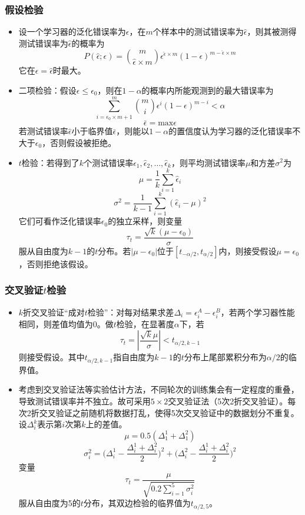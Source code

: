 \documentclass{ctexart}
\begin{document}
					\subsubsection{假设检验}
						\begin{itemize}
							\item 设一个学习器的泛化错误率为$\epsilon$，在$m$个样本中的测试错误率为$\hat{\epsilon}$，则其被测得测试错误率为$\hat{\epsilon}$的概率为\[P(\hat{\epsilon};\epsilon)=\binom{m}{\hat{\epsilon}\times m}\epsilon^{\hat{\epsilon}\times m}(1-\epsilon)^{m-\hat{\epsilon}\times m}\]它在$\epsilon=\hat{\epsilon}$时最大。
							\item 二项检验：假设$\epsilon\le\epsilon_0$，则在$1-\alpha$的概率内所能观测到的最大错误率为\[\sum_{i=\epsilon_0\times m+1}^{m}\binom{m}{i}\epsilon^i(1-\epsilon)^{m-i}<\alpha\]\[\bar{\epsilon}=\mathrm{max}\epsilon\]若测试错误率$\hat{\epsilon}$小于临界值$\bar{\epsilon}$，则能以$1-\alpha$的置信度认为学习器的泛化错误率不大于$\epsilon_0$，否则假设被拒绝。
							\item $t$检验：若得到了$k$个测试错误率$\hat{\epsilon}_1,\hat{\epsilon}_2,\dots,\hat{\epsilon}_k$，则平均测试错误率$\mu$和方差$\sigma^2$为\[\mu=\frac{1}{k}\sum_{i=1}^{k}\hat{\epsilon}_i\]\[\sigma^2=\frac{1}{k-1}\sum_{i=1}^{k}(\hat{\epsilon}_i-\mu)^2\]它们可看作泛化错误率$\epsilon_0$的独立采样，则变量\[\tau_t=\frac{\sqrt{k}(\mu-\epsilon_0)}{\sigma}\]服从自由度为$k-1$的$t$分布。若$|\mu-\epsilon_0|$位于$[t_{-\alpha/2},t_{\alpha/2}]$内，则接受假设$\mu=\epsilon_0$，否则拒绝该假设。
						\end{itemize}
					\subsubsection{交叉验证$t$检验}
						\begin{itemize}
							\item $k$折交叉验证``成对$t$检验''：对每对结果求差$\Delta_i=\epsilon_i^A-\epsilon_i^B$，若两个学习器性能相同，则差值均值为0。做$t$检验，在显著度$\alpha$下，若\[\tau_t=|\frac{\sqrt{k}\mu}{\sigma}|<t_{\alpha/2,k-1}\]则接受假设。其中$t_{\alpha/2,k-1}$指自由度为$k-1$的$t$分布上尾部累积分布为$\alpha/2$的临界值。
							\item 考虑到交叉验证法等实验估计方法，不同轮次的训练集会有一定程度的重叠，导致测试错误率并不独立。故可采用$5\times2$交叉验证法（5次2折交叉验证）。每次2折交叉验证之前随机将数据打乱，使得5次交叉验证中的数据划分不重复。设$\Delta_i^k$表示第$i$次第$k$上的差值。\[\mu=0.5(\Delta_1^1+\Delta_1^2)\]\[\sigma_i^2=\big(\Delta_i^1-\frac{\Delta_i^1+\Delta_i^2}{2}\big)^2+\big(\Delta_i^2-\frac{\Delta_i^1+\Delta_i^2}{2}\big)^2\]变量\[\tau_t=\frac{\mu}{\sqrt{0.2\sum_{i=1}^{5}\sigma_i^2}}\]服从自由度为5的$t$分布，其双边检验的临界值为$t_{\alpha/2,5}$。
						\end{itemize}
\end{document}
